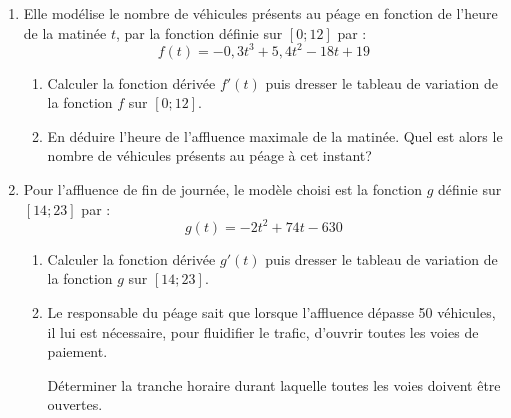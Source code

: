 \documentclass{article}
\begin{document}
\begin{enumerate}
    \item Elle modélise le nombre de véhicules présents au péage en fonction de l'heure de la matinée $t$, par la fonction définie sur $[0 ; 12]$ par :
    $$f(t) = -0,3t^3 + 5,4t^2 - 18t + 19$$
    \begin{enumerate}
      \item Calculer la fonction dérivée $f'(t)$ puis dresser le tableau de variation de la fonction $f$ sur $[0 ; 12]$.
      \item En déduire l'heure de l'affluence maximale de la matinée. Quel est alors le nombre de véhicules présents au péage à cet instant?
    \end{enumerate}
  
    \item Pour l'affluence de fin de journée, le modèle choisi est la fonction $g$ définie sur $[14 ; 23]$ par :
    $$g(t) = -2t^2 + 74t - 630$$
    \begin{enumerate}
      \item Calculer la fonction dérivée $g'(t)$ puis dresser le tableau de variation de la fonction $g$ sur $[14 ; 23]$.
      \item Le responsable du péage sait que lorsque l'affluence dépasse 50 véhicules, il lui est nécessaire, pour fluidifier le trafic, d'ouvrir toutes les voies de paiement.
      
      Déterminer la tranche horaire durant laquelle toutes les voies doivent être ouvertes.
    \end{enumerate}
  \end{enumerate}


  
\end{document}
